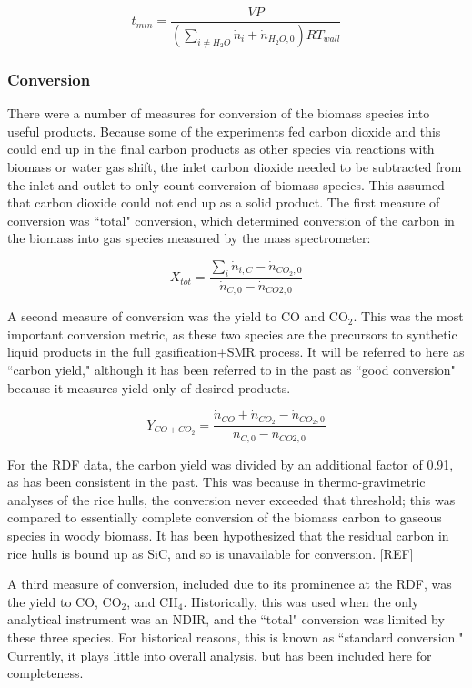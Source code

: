 \documentclass[11pt,twocolumn]{article}
\begin{document}
\begin{equation}
	t_{min} = \frac{VP}{(\sum_{i \ne H_{2}O}\dot{n}_{i}+\dot{n}_{H_{2}O,0})RT_{wall}}
\end{equation}

\subsubsection*{Conversion}
There were a number of measures for conversion of the biomass species into useful products.  Because some of the experiments fed carbon dioxide and this could end up in the final carbon products as other species via reactions with biomass or water gas shift, the inlet carbon dioxide needed to be subtracted from the inlet and outlet to only count conversion of biomass species.  This assumed that carbon dioxide could not end up as a solid product.  The first measure of conversion was ``total" conversion, which determined conversion of the carbon in the biomass into gas species measured by the mass spectrometer:

\begin{equation}
	X_{tot} = \frac{\sum_{i}\dot{n}_{i,C}-\dot{n}_{CO_{2},0}}{\dot{n}_{C,0}-\dot{n}_{CO{2},0}}
\end{equation}

A second measure of conversion was the yield to CO and CO$_2$.  This was the most important conversion metric, as these two species are the precursors to synthetic liquid products in the full gasification+SMR process.  It will be referred to here as ``carbon yield," although it has been referred to in the past as ``good conversion" because it measures yield only of desired products.

\begin{equation}
	Y_{CO+CO_{2}} = \frac{\dot{n}_{CO}+\dot{n}_{CO_{2}}-\dot{n}_{CO_{2},0}}{\dot{n}_{C,0}-\dot{n}_{CO{2},0}}
\end{equation}

For the RDF data, the carbon yield was divided by an additional factor of 0.91, as has been consistent in the past.  This was because in thermo-gravimetric analyses of the rice hulls, the conversion never exceeded that threshold; this was compared to essentially complete conversion of the biomass carbon to gaseous species in woody biomass.  It has been hypothesized that the residual carbon in rice hulls is bound up as SiC, and so is unavailable for conversion. [REF]

A third measure of conversion, included due to its prominence at the RDF, was the yield to CO, CO$_2$, and CH$_4$.  Historically, this was used when the only analytical instrument was an NDIR, and the ``total" conversion was limited by these three species.  For historical reasons, this is known as ``standard conversion."  Currently, it plays little into overall analysis, but has been included here for completeness.
\end{document}

